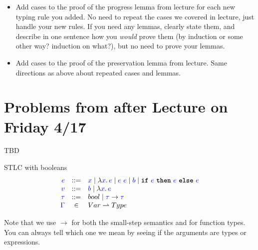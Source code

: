 \documentclass{article}
\newcommand{\meta}[1]{{\color{blue}#1}}
\newcommand{\stlc}{\textsc{STLC}}
\newcommand{\progtext}[1]{\ensuremath{\text{\ttfamily\bfseries #1}}}
\newcommand{\progif}{\progtext{if}}
\newcommand{\progthen}{\progtext{then}}
\newcommand{\progelse}{\progtext{else}}
\newcommand{\progtrue}{\progtext{true}}
\newcommand{\progfalse}{\progtext{false}}
\begin{document}
\begin{enumerate}[leftmargin=*,itemindent=*,start=1,label={{\bf Problem \arabic*}.},ref=\arabic*]
\begin{enumerate}[(a)]
    \begin{itemize}
    \item Add cases to the proof of the progress lemma from lecture for each new
      typing rule you added. No need to repeat the cases we covered in lecture,
      just handle your new rules. If you need any lemmas, clearly state them,
      and describe in one sentence how you \emph{would} prove them (by induction
      or some other way? induction on what?), but no need to prove your lemmas.
    \item Add cases to the proof of the preservation lemma from lecture. Same
      directions as above about repeated cases and lemmas.
    \end{itemize}
  \end{enumerate}
\end{enumerate}

\section*{Problems from after Lecture on Friday 4/17}

TBD

\clearpage
  \noindent\stlc{} with booleans
  \[
    \begin{array}{rcl}
      \meta{e} & ::= & \meta{x} \mid \lambda \meta{x}.\,\meta{e} \mid \meta{e}\ \meta{e}\mid \meta{b} \mid \progif\ \meta{e}\ \progthen\ \meta{e}\ \progelse\ \meta{e}\\
      \meta{v} & ::= & \meta{b} \mid \lambda \meta{x}.\,\meta{e}\\
      \meta{\tau} & ::= & bool \mid \meta{\tau} \to \meta{\tau}\\
      \meta{\Gamma} & \in & Var \rightharpoonup Type
    \end{array}
  \]
  \boxed{\meta{e} \to \meta{e}}
  Note that we use $\to$ for both the small-step semantics and for function types.
  You can always tell which one we mean by seeing if the arguments are types or expressions.
\end{document}
